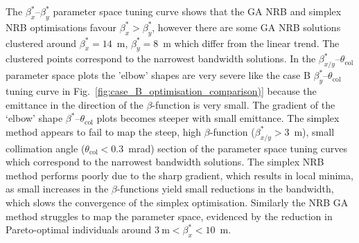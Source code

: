 \documentclass[../main.tex]{subfiles}
\begin{document}
The $\beta_{x}^{*}$--$\beta_{y}^{*}$ parameter space tuning curve shows that the GA NRB and simplex NRB optimisations favour $\beta_{x}^{*} > \beta_{y}^{*}$, however there are some GA NRB solutions clustered around $\beta_{x}^{*} = 14$~\si{\meter}, $\beta_{y}^{*} = 8$~\si{\meter} which differ from the linear trend. The clustered points correspond to the narrowest bandwidth solutions. In the $\beta_{x/y}^{*}$--$\theta_{\mathrm{col}}$ parameter space plots the 'elbow' shapes are very severe like the  case B $\beta_{y}^{*}$--$\theta_{\mathrm{col}}$ tuning curve in Fig.~\ref{fig:case_B_optimisation_comparison)} because the emittance in the direction of the $\beta$-function is very small. The gradient of the `elbow' shape $\beta^{*}$--$\theta_{\mathrm{col}}$ plots becomes steeper with small emittance. The simplex method appears to fail to map the steep, high $\beta$-function ($\beta_{x/y}^{*} > 3$~\si{\meter}), small collimation angle ($\theta_{\mathrm{col}} < 0.3$~\si{\milli\radian}) section of the parameter space tuning curves which correspond to the narrowest bandwidth solutions. The simplex NRB method performs poorly due to the sharp gradient, which results in local minima, as small increases in the $\beta$-functions yield small reductions in the bandwidth, which slows the convergence of the simplex optimisation. Similarly the NRB GA method struggles to map the parameter space, evidenced by the reduction in Pareto-optimal individuals around $3~\si{\meter} < \beta_{x}^{*} < 10$~\si{\meter}. 
\end{document}
